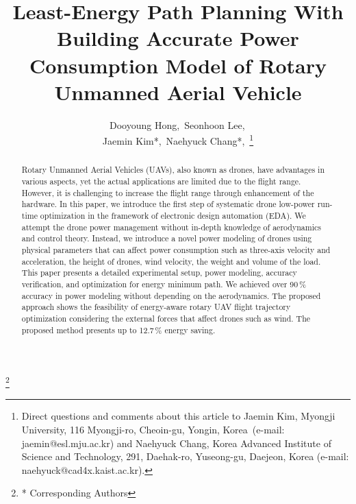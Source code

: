 \documentclass[journal]{./template/IEEEtran}
\begin{document}
\makeatletter

\newcommand\blfootnote[1]{%
  \begingroup
  \renewcommand\thefootnote{}\footnote{#1}%
  \addtocounter{footnote}{-1}%
  \endgroup
}

\newcommand\fs@norules{\def\@fs@cfont{\bfseries}\let\@fs@capt\floatc@ruled
  \def\@fs@pre{}%
  \def\@fs@post{}%
  \def\@fs@mid{\kern3pt}%
  \let\@fs@iftopcapt\iftrue}
\makeatother
{}

\title{Least-Energy Path Planning With Building Accurate Power Consumption Model of Rotary Unmanned Aerial Vehicle\\
}
\author{
Dooyoung Hong,\,
Seonhoon Lee,\,\\
Jaemin Kim*,\,
Naehyuck Chang*,\,
\thanks{Direct questions and comments about this article to Jaemin Kim, Myongji University, 116 Myongji-ro, Cheoin-gu, Yongin, Korea\, (e-mail: jaemin@esl.mju.ac.kr) and Naehyuck Chang, Korea Advanced Institute of Science and Technology, 291, Daehak-ro, Yuseong-gu, Daejeon, Korea (e-mail: naehyuck@cad4x.kaist.ac.kr).}
}
\maketitle
\blfootnote{* Corresponding Authors}

\begin{abstract}

Rotary Unmanned Aerial Vehicles (UAVs), also known as drones, have advantages in various aspects, yet the actual applications are limited due to the flight range. However, it is challenging to increase the flight range through enhancement of the hardware. 
In this paper, we introduce the first step of systematic drone low-power run-time optimization in the framework of electronic design automation (EDA). 
We attempt the drone power management without in-depth knowledge of aerodynamics and control theory. 
Instead, we introduce a novel power modeling of drones using physical parameters that can affect power consumption such as three-axis velocity and acceleration, the height of drones, wind velocity, the weight and volume of the load. 
This paper presents a detailed experimental setup, power modeling, accuracy verification, and optimization for energy minimum path. 
We achieved over 90\,\% accuracy in power modeling without depending on the aerodynamics. 
The proposed approach shows the feasibility of energy-aware rotary UAV flight trajectory optimization considering the external forces that affect drones such as wind. The proposed method presents up to 12.7\,\% energy saving.
\label{Section: abstract}
\end{abstract}
\end{document}
